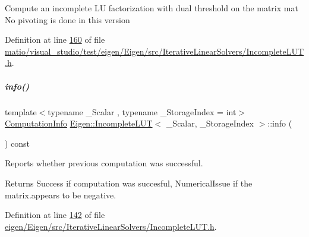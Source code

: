 Compute an incomplete LU factorization with dual threshold on the matrix mat No pivoting is done in this version 

Definition at line \hyperlink{matio_2visual__studio_2test_2eigen_2_eigen_2src_2_iterative_linear_solvers_2_incomplete_l_u_t_8h_source_l00160}{160} of file \hyperlink{matio_2visual__studio_2test_2eigen_2_eigen_2src_2_iterative_linear_solvers_2_incomplete_l_u_t_8h_source}{matio/visual\+\_\+studio/test/eigen/\+Eigen/src/\+Iterative\+Linear\+Solvers/\+Incomplete\+L\+U\+T.\+h}.

\mbox{\label{group___iterative_linear_solvers___module_a941c7d34f15d7bc287e780636be0ee2b}} 
\subparagraph{\texorpdfstring{info()}{info()}\hspace{0.1cm}{\footnotesize\ttfamily [1/2]}}
{\footnotesize\ttfamily template$<$typename \+\_\+\+Scalar , typename \+\_\+\+Storage\+Index  = int$>$ \\
\hyperlink{group__enums_ga85fad7b87587764e5cf6b513a9e0ee5e}{Computation\+Info} \hyperlink{group___iterative_linear_solvers___module_class_eigen_1_1_incomplete_l_u_t}{Eigen\+::\+Incomplete\+L\+UT}$<$ \+\_\+\+Scalar, \+\_\+\+Storage\+Index $>$\+::info (\begin{DoxyParamCaption}{ }\end{DoxyParamCaption}) const\hspace{0.3cm}{\ttfamily [inline]}}



Reports whether previous computation was successful. 

\begin{DoxyReturn}{Returns}
{\ttfamily Success} if computation was succesful, {\ttfamily Numerical\+Issue} if the matrix.\+appears to be negative. 
\end{DoxyReturn}


Definition at line \hyperlink{eigen_2_eigen_2src_2_iterative_linear_solvers_2_incomplete_l_u_t_8h_source_l00142}{142} of file \hyperlink{eigen_2_eigen_2src_2_iterative_linear_solvers_2_incomplete_l_u_t_8h_source}{eigen/\+Eigen/src/\+Iterative\+Linear\+Solvers/\+Incomplete\+L\+U\+T.\+h}.

